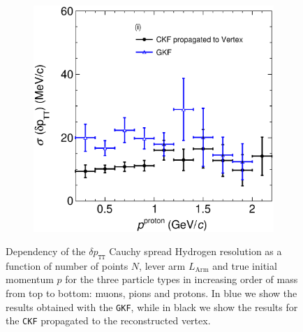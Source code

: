 \begin{figure}[t]
\begin{subfigure}[b]{0.32\textwidth}
         \caption{}
        \label{fig:deltapTTVSlArmMC2212.eps}
     \end{subfigure}
     \begin{subfigure}[b]{0.32\textwidth}
         \centering
         \includegraphics[width=\textwidth]{figures/ch6-TKI/2D/deltapTTVSp2212.eps}
         \caption{}
         \label{fig:deltapTTVSp2212.eps}
     \end{subfigure}
        \caption{Dependency of the $\delta p_\texttt{TT}$ Cauchy spread Hydrogen resolution as a function of number of points $N$, lever arm $L_\text{Arm}$ and true initial momentum $p$ for the three particle types in increasing order of mass from top to bottom: muons, pions and protons. In blue we show the results obtained with the \texttt{\texttt{GKF}}, while in black we show the results for the \texttt{\texttt{CKF}} propagated to the reconstructed vertex.} \label{fig:dpTTVSpart}
\end{figure}

